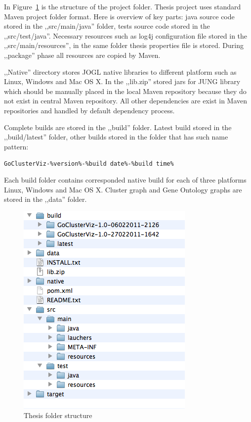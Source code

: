 In Figure~\ref{fig:THESIS_FOLDER_STRUCTURE} is the structure of the project folder. Thesis project uses standard Maven project folder format. Here is overview of key parts: java source code stored in the ,,src/main/java'' folder, tests source code stored in the ,,src/test/java''. Necessary resources such as log4j configuration file stored in the ,,src/main/resources'', in the same folder thesis properties file is stored. During ,,package'' phase all resources are copied by Maven.


,,Native'' directory stores JOGL native libraries to different platform such as Linux, Windows and Mac OS X. In the ,,lib.zip'' stored jars for JUNG library which should be manually placed in the local Maven repository because they do not  exist in central Maven repository. All other dependencies are exist in Maven repositories and handled by default dependency process.


Complete builds are stored in the ,,build'' folder. Latest build stored in the ,,build/latest'' folder, other builds stored in the folder that has such name pattern:


\texttt{GoClusterViz-\%version\%-\%build date\%-\%build time\%}


Each build folder contains corresponded native build for each of three platforms Linux, Windows and Mac OS X. Cluster graph and Gene Ontology graphs are stored in the ,,data'' folder.

\begin{figure}[h!]
\centering
\includegraphics[scale=0.6]{pictures/thesis_folder_structure.png}
\caption{Thesis folder structure}
\label{fig:THESIS_FOLDER_STRUCTURE}
\end{figure}

